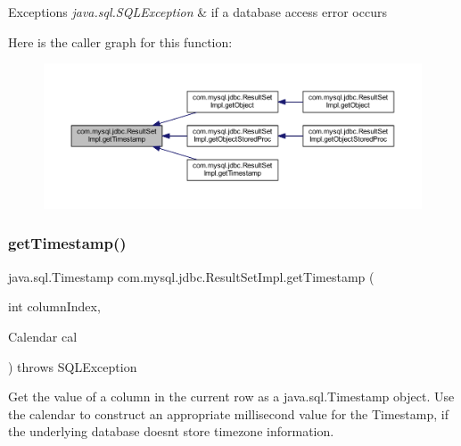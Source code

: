 \begin{DoxyExceptions}{Exceptions}
{\em java.\+sql.\+S\+Q\+L\+Exception} & if a database access error occurs \\
\hline
\end{DoxyExceptions}
Here is the caller graph for this function\+:
\nopagebreak
\begin{figure}[H]
\begin{center}
\leavevmode
\includegraphics[width=350pt]{classcom_1_1mysql_1_1jdbc_1_1_result_set_impl_a2d88cacb474130b5646e9cd9fc043718_icgraph}
\end{center}
\end{figure}
\mbox{\label{classcom_1_1mysql_1_1jdbc_1_1_result_set_impl_ad4a93118a534cdfa3432fa71de34ffa6}} 
\subsubsection{\texorpdfstring{get\+Timestamp()}{getTimestamp()}\hspace{0.1cm}{\footnotesize\ttfamily [2/4]}}
{\footnotesize\ttfamily java.\+sql.\+Timestamp com.\+mysql.\+jdbc.\+Result\+Set\+Impl.\+get\+Timestamp (\begin{DoxyParamCaption}\item[{int}]{column\+Index,  }\item[{Calendar}]{cal }\end{DoxyParamCaption}) throws S\+Q\+L\+Exception}

Get the value of a column in the current row as a java.\+sql.\+Timestamp object. Use the calendar to construct an appropriate millisecond value for the Timestamp, if the underlying database doesn\textquotesingle{}t store timezone information.


